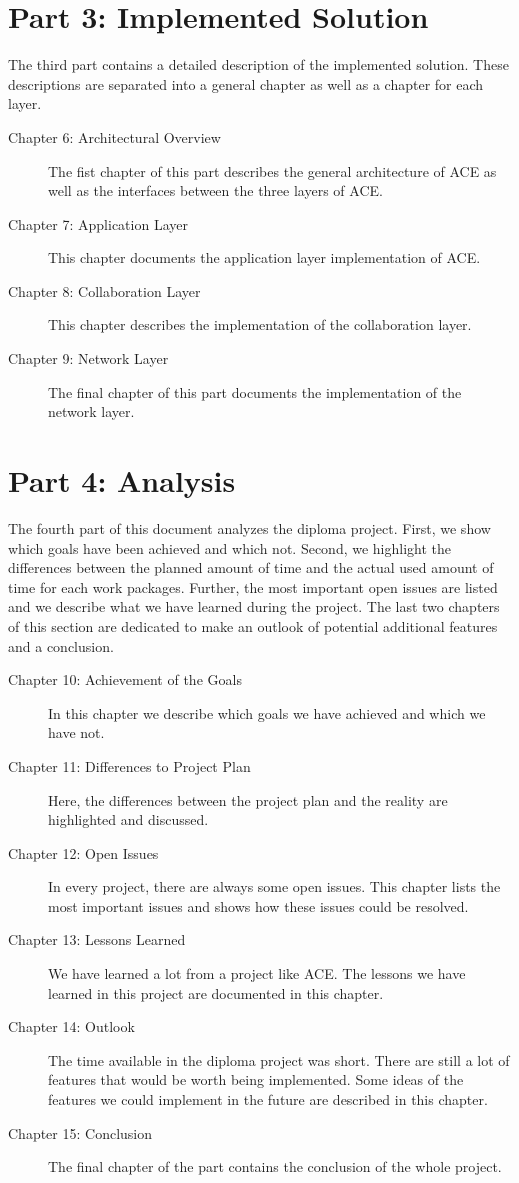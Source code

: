  
\section*{Part 3: Implemented Solution}
The third part contains a detailed description of the implemented solution.
These descriptions are separated into a general chapter as well as a
chapter for each layer.

\begin{description}
 \item[Chapter 6: Architectural Overview] The fist chapter of this part describes the general architecture of ACE as well as the interfaces between the three layers of ACE.
 \item[Chapter 7: Application Layer] This chapter documents the application layer implementation of ACE.
 \item[Chapter 8: Collaboration Layer] This chapter describes the implementation of the collaboration layer.
 \item[Chapter 9: Network Layer] The final chapter of this part documents the implementation of the network layer.
\end{description}

 
\section*{Part 4: Analysis}
The fourth part of this document analyzes the diploma project. First, we
show which goals have been achieved and which not. Second, we highlight
the differences between the planned amount of time and the actual used
amount of time for each work packages. Further, the most important open
issues are listed and we describe what we have learned during the project.
The last two chapters of this section are dedicated to make an outlook
of potential additional features and a conclusion.

\begin{description}
 \item[Chapter 10: Achievement of the Goals] In this chapter we describe which goals we have achieved and which we have not.
 \item[Chapter 11: Differences to Project Plan] Here, the differences between the project plan and the reality are highlighted and discussed.
 \item[Chapter 12: Open Issues] In every project, there are always some open issues. This chapter lists the most important issues and shows how these issues could be resolved.
 \item[Chapter 13: Lessons Learned] We have learned a lot from a project like ACE. The lessons we have learned in this project are documented in this chapter.
 \item[Chapter 14: Outlook] The time available in the diploma project was short. There are still a lot of features that would be worth being implemented. Some ideas of the features we could implement in the future are described in this chapter.
 \item[Chapter 15: Conclusion] The final chapter of the part contains the conclusion of the whole project.
\end{description}
 
